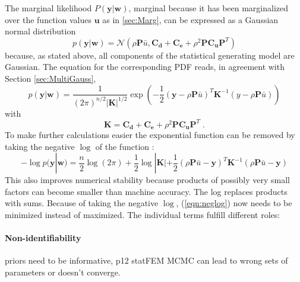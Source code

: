 \documentclass[%
  a4paper,oneside,%
  11pt,%
  smallchapters,
  style=printdev,
  extramargin,
  green,%
  rgb, <cmyk>
  ]{tubsbook}
\begin{document}
The marginal likelihood $P(\bm{y}|\bm{w})$, marginal because it has been marginalized over the function values $\bm{u}$ as in \ref{sec:Marg}, can be expressed as a Gaussian normal distribution
\begin{equation}
p(\bm{y}|\bm{w}) = \mathcal{N}(\rho \bm{P}\bar{u}, \bm{C_d}+\bm{C_e} + \rho^2 \bm{P} \bm{C_u} \bm{P}^T)
\end{equation}
because, as stated above, all components of the statistical generating model are Gaussian.
The equation for the corresponding PDF reads, in agreement with Section \ref{sec:MultiGauss},
\begin{equation}
p(\bm{y}|\bm{w}) = \frac{1}{(2 \pi)^{n/2} |\bm{K}|^{1/2} } \exp \left(   -\frac{1}{2} (\bm{y} - \rho \bm{P}\bar{u})^T \bm{K}^{-1} (y - \rho \bm{P}\bar{u})   \right)
\end{equation}
with
\begin{equation}
\bm{K} = \bm{C_d}+\bm{C_e} + \rho^2 \bm{P} \bm{C_u} \bm{P}^T \; .
\end{equation}
%
To make further calculations easier the exponential function can be removed by taking the negative $\log$ of the function \cite[p.113]{rasmussen2006}:
\begin{equation}
- \log p(\bm{y}|\bm{w}) = \frac{n}{2} \log(2 \pi) + \frac{1}{2} \log |\bm{K}| + \frac{1}{2}(\rho \bm{P}\bar{u} - \bm{y})^T \bm{K}^{-1} (\rho \bm{P}\bar{u} - \bm{y}) 
\label{eqn:neglog}
\end{equation}
This also improves numerical stability because products of possibly very small factors can become smaller than machine accuracy. The log replaces products with sums.
Because of taking the negative $\log$, (\ref{eqn:neglog}) now needs to be minimized instead of maximized. 
The individual terms fulfill different roles: 

\paragraph{Non-identifiability}
priors need to be informative, p12 statFEM
\cite{Eberly2000} MCMC can lead to wrong sets of parameters or doesn't converge.
\cite{Bayarri} \cite{kennedy2001}
\end{document}

